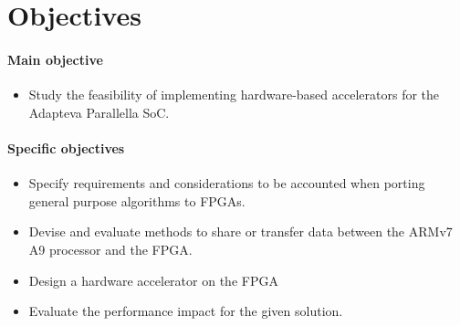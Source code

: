 \documentclass[11pt,letterpaper]{article}
\begin{document}



\section{Objectives}

\paragraph{Main objective}
\begin{itemize}
\item Study the feasibility of implementing hardware-based accelerators for the Adapteva Parallella SoC.
\end{itemize}

\paragraph{Specific objectives}
\begin{itemize}
    \item Specify requirements and considerations to be accounted when porting general purpose algorithms to FPGAs.
    \item Devise and evaluate methods to share or transfer data between the ARMv7 A9 processor and the FPGA. 
    \item Design a hardware accelerator on the FPGA
    \item Evaluate the performance impact for the given solution.
\end{itemize}
\end{document}

